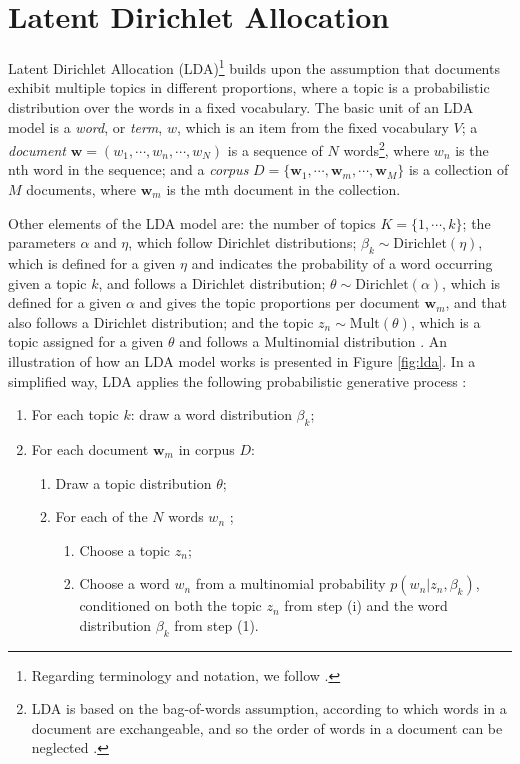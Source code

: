 \section{Latent Dirichlet Allocation} \label{LDA}

Latent Dirichlet Allocation (LDA)\footnote{Regarding terminology and notation, we follow \cite{blei_latent_2003}.} builds upon the assumption that documents exhibit multiple topics in different proportions, where a topic is a probabilistic distribution over the words in a fixed vocabulary. The basic unit of an LDA model is a \textit{word}, or \textit{term}, $w$, which is an item from the fixed vocabulary $V$; a \textit{document} $\mathbf{w} = (w_{1}, \cdots, w_{n}, \cdots, w_{N})$ is a sequence of $N$ words\footnote{LDA is based on the bag-of-words assumption, according to which words in a document are exchangeable, and so the order of words in a document can be neglected \citep{blei_latent_2003}.}, where $w_{n}$ is the nth word in the sequence; and a \textit{corpus} $D = \{ \mathbf{w}_{1}, \cdots, \mathbf{w}_{m}, \cdots, \mathbf{w}_{M} \}$ is a collection of $M$ documents, where $\mathbf{w}_{m}$ is the mth document in the collection. 

Other elements of the LDA model are: the number of topics $K = \{ 1, \cdots, k \}$; the parameters $\alpha$ and $\eta$, which follow Dirichlet distributions; $\beta_{k} \sim \text{Dirichlet}(\eta)$, which is defined for a given $\eta$ and indicates the probability of a word occurring given a topic $k$, and follows a Dirichlet distribution; $\theta \sim \text{Dirichlet}(\alpha)$, which is defined for a given $\alpha$ and gives the topic proportions per document $\mathbf{w}_{m}$, and that also follows a Dirichlet distribution; and the topic $z_{n} \sim \text{Mult}(\theta)$, which is a topic assigned for a given $\theta$ and follows a Multinomial distribution \citep{blei_latent_2003, blei_topic_2009, grun_topicmodels_2011}. An illustration of how an LDA model works is presented in Figure \ref{fig:lda}. In a simplified way, LDA applies the following probabilistic generative process \citep{blei_topic_2009, grun_topicmodels_2011, ponweiser_latent_2012}:

\begin{enumerate}
\item For each topic $k$: draw a word distribution $\beta_{k}$;
\item For each document $\mathbf{w}_{m}$ in corpus $D$:
\begin{enumerate}
	\item Draw a topic distribution $\theta$;
	\item For each of the $N$ words $w_{n}$	;
	\begin{enumerate}
		\item Choose a topic $z_{n}$;
		\item Choose a word $w_{n}$ from a multinomial probability $p(w_{n} | z_{n}, \beta_{k})$, conditioned on both the topic $z_{n}$ from step (i) and the word distribution $\beta_{k}$ from step (1).
	\end{enumerate}
\end{enumerate}
\end{enumerate} 

